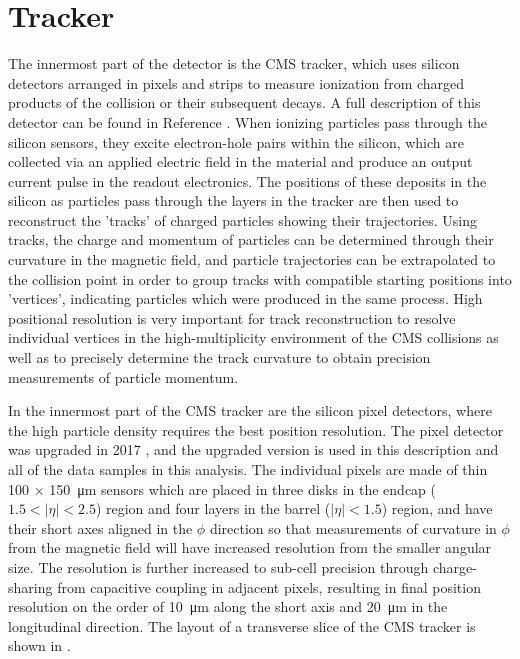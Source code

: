 \section{Tracker}
The innermost part of the detector is the CMS tracker, which uses silicon detectors arranged in pixels and strips to measure ionization from charged products of the collision or their subsequent decays. 
A full description of this detector can be found in Reference \cite{trackerTDR}.
When ionizing particles pass through the silicon sensors, they excite electron-hole pairs within the silicon, which are collected via an applied electric field in the material and produce an output current pulse in the readout electronics.
The positions of these deposits in the silicon as particles pass through the layers in the tracker are then used to reconstruct the 'tracks' of charged particles showing their trajectories.
Using tracks, the charge and momentum of particles can be determined through their curvature in the magnetic field, and particle trajectories can be extrapolated to the collision point in order to group tracks with compatible starting positions into 'vertices', indicating particles which were produced in the same process. 
High positional resolution is very important for track reconstruction to resolve individual vertices in the high-multiplicity environment of the CMS collisions as well as to precisely determine the track curvature to obtain precision measurements of particle momentum. 

In the innermost part of the CMS tracker are the silicon pixel detectors, where the high particle density requires the best position resolution. 
The pixel detector was upgraded in 2017 \cite{pixelUpgrade}, and the upgraded version is used in this description and all of the data samples in this analysis. 
The individual pixels are made of thin 100 $\times$ \SI{150}{\micro\meter} sensors which are placed in three disks in the endcap ($1.5<\lvert\eta\rvert<2.5$) region and four layers in the barrel ($\lvert\eta\rvert<1.5$) region, and have their short axes aligned in the $\phi$ direction so that measurements of curvature in $\phi$ from the magnetic field will have increased resolution from the smaller angular size. 
The resolution is further increased to sub-cell precision through charge-sharing from capacitive coupling in adjacent pixels, resulting in final position resolution on the order of \SI{10}{\micro\meter} along the short axis and \SI{20}{\micro\meter} in the longitudinal direction.
The layout of a transverse slice of the CMS tracker is shown in .

